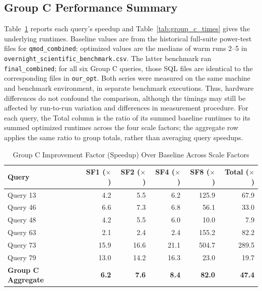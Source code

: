\documentclass{ULBreport}
\begin{document}
\subsection{Group C Performance Summary}
Table~\ref{tab:group_c_results} reports each query's speedup and Table~\ref{tab:group_c_times} gives the underlying runtimes. Baseline values are from the historical full-suite power-test files for \texttt{qmod\_combined}; optimized values are the medians of warm runs 2--5 in \texttt{overnight\_scientific\_benchmark.csv}. The latter benchmark ran \texttt{final\_combined}; for all six Group C queries, those SQL files are identical to the corresponding files in \texttt{our\_opt}. Both series were measured on the same machine and benchmark environment, in separate benchmark executions. Thus, hardware differences do not confound the comparison, although the timings may still be affected by run-to-run variation and differences in measurement procedure. For each query, the Total column is the ratio of its summed baseline runtimes to its summed optimized runtimes across the four scale factors; the aggregate row applies the same ratio to group totals, rather than averaging query speedups.

\begin{table}[htbp]
\centering
\caption{Group C Improvement Factor (Speedup) Over Baseline Across Scale Factors}
\label{tab:group_c_results}
\begin{tabular}{@{}lrrrrr@{}}
\toprule
\textbf{Query} & \textbf{SF1 ($\times$)} & \textbf{SF2 ($\times$)} & \textbf{SF4 ($\times$)} & \textbf{SF8 ($\times$)} & \textbf{Total ($\times$)} \\ \midrule
Query 13 & 4.2 & 5.5 & 6.2 & 125.9 & 67.9 \\
Query 46 & 6.6 & 7.3 & 6.8 & 56.1 & 33.0 \\
Query 48 & 4.2 & 5.5 & 6.0 & 10.0 & 7.9 \\
Query 63 & 2.1 & 2.4 & 2.4 & 155.2 & 82.2 \\
Query 73 & 15.9 & 16.6 & 21.1 & 504.7 & 289.5 \\
Query 79 & 13.0 & 14.2 & 16.3 & 23.0 & 19.7 \\ \midrule
\textbf{Group C Aggregate} & \textbf{6.2} & \textbf{7.6} & \textbf{8.4} & \textbf{82.0} & \textbf{47.4} \\ \bottomrule
\end{tabular}
\end{table}
\end{document}

